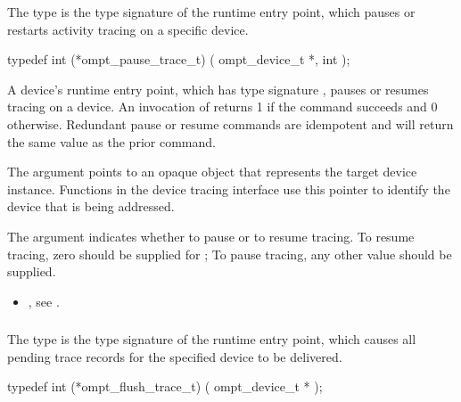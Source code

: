 \summary
The  type is the type signature of the 
 runtime entry point, which pauses or 
restarts activity tracing on a specific device.

\format
\begin{ccppspecific}
\begin{omptInquiry}
typedef int (*ompt_pause_trace_t) (
  ompt_device_t *,
  int 
);
\end{omptInquiry}
\end{ccppspecific}

\descr
A device's  runtime entry point, which has type
signature , pauses or resumes tracing on a device.
An invocation of  returns 1 if the command
succeeds and 0 otherwise. Redundant pause or resume commands are 
idempotent and will return the same value as the prior command. 

\argdesc
The  argument points to an opaque object that represents
the target device instance. Functions in the device tracing interface
use this pointer to identify the device that is being addressed.

The  argument indicates whether to pause or to resume 
tracing. To resume tracing, zero should be supplied for ;
To pause tracing, any other value should be supplied.

\crossreferences
\begin{itemize}
\item {}, see .
\end{itemize}



\subsubsection{}
\label{sec:ompt_flush_trace_t}

\summary
The  type is the type signature of the 
 runtime entry point, which causes all 
pending trace records for the specified device to be delivered.

\format
\begin{ccppspecific}
\begin{omptInquiry}
typedef int (*ompt_flush_trace_t) (
  ompt_device_t *
);
\end{omptInquiry}
\end{ccppspecific}

